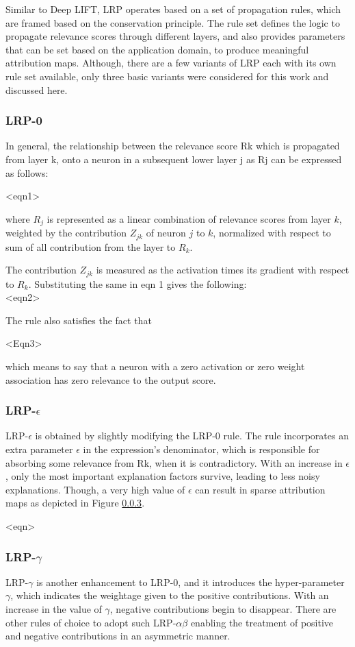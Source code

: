 \documentclass[../report.tex]{subfiles}
\begin{document}
Similar to Deep LIFT, LRP operates based on a set of propagation rules, which are framed based on the conservation principle. The rule set defines the logic to propagate relevance scores through different layers, and also provides parameters that can be set based on the application domain, to produce meaningful attribution maps. Although, there are a few variants of LRP each with its own rule set available, only three basic variants were considered for this work and discussed here.

\subsubsection{LRP-0}
In general,  the relationship between the relevance score Rk which is propagated from layer k, onto a neuron in a subsequent lower layer j as Rj can be expressed as follows:

<eqn1>

where $R_j$ is represented as a linear combination of relevance scores from layer $k$, weighted by the  contribution $Z_{jk}$ of neuron $j$ to $k$, normalized with respect to sum of all contribution from the layer to $R_k$.

The contribution $Z_{jk}$ is measured as the activation times its gradient with respect to $R_k$. Substituting the same in eqn 1 gives the following:\\
<eqn2>


The rule also satisfies the fact that 

<Eqn3>

which means to say that a neuron with a zero activation or zero weight association has zero relevance to the output score.

\subsubsection{LRP-$\epsilon$}

LRP-$\epsilon$ is obtained by slightly modifying the LRP-0 rule. The rule incorporates an extra parameter $\epsilon$ in the expression’s denominator, which is responsible for absorbing some relevance from Rk, when it is contradictory. With an increase in $\epsilon$, only the most important explanation factors survive, leading to less noisy explanations. Though, a very high value of $\epsilon$ can result in sparse attribution maps as depicted in Figure \ref{}.

<eqn>

\subsubsection{LRP-$\gamma$}
LRP-$\gamma$ is another enhancement to LRP-0, and it introduces the hyper-parameter $\gamma$, which indicates the weightage given to the positive contributions. With an increase in the value of $\gamma$, negative contributions begin to disappear. There are other rules of choice to adopt such LRP-$\alpha\beta$ enabling the treatment of positive and negative contributions in an asymmetric manner.
\end{document}
